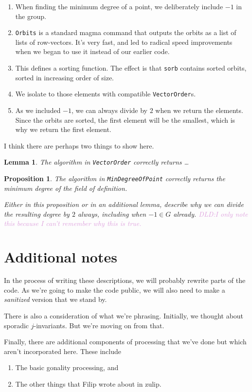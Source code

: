 \documentclass[11pt,reqno]{amsart}
\makeatletter
\theoremstyle{plain}
\newtheorem{lemma}[theorem]{Lemma}
\newtheorem{proposition}[theorem]{Proposition}
\theoremstyle{definition}
\newcommand{\DLD}[1]{\textcolor{Plum}{DLD:\@ #1}}
\makeatother
\begin{document}
\begin{enumerate}
  \item When finding the minimum degree of a point, we deliberately include
  $-1$ in the group.

  \item \texttt{Orbits} is a standard magma command that outputs the orbits as
  a list of lists of row-vectors. It's very fast, and led to radical speed
  improvements when we began to use it instead of our earlier code.

  \item This defines a sorting function. The effect is that \texttt{sorb}
  contains sorted orbits, sorted in increasing order of size.

  \item We isolate to those elements with compatible \texttt{VectorOrder}s.

  \item As we included $-1$, we can always divide by $2$ when we return the
  elements. Since the orbits are sorted, the first element will be the
  smallest, which is why we return the first element.
\end{enumerate}

I think there are perhaps two things to show here.

\begin{lemma}
  The algorithm in \texttt{VectorOrder} correctly returns \ldots
\end{lemma}

\begin{proposition}
  The algorithm in \texttt{MinDegreeOfPoint} correctly returns the minimum
  degree of the field of definition.

  Either in this proposition or in an additional lemma, describe why we can
  divide the resulting degree by $2$ \emph{always}, including when $-1 \in G$
  already. \DLD{I only note this because I can't remember why this is true.}
\end{proposition}


\section{Additional notes}

In the process of writing these descriptions, we will probably rewrite parts of
the code. As we're going to make the code public, we will also need to make a
\emph{sanitized} version that we stand by.

There is also a consideration of what we're phrasing. Initially, we thought
about sporadic $j$-invariants. But we're moving on from that.

Finally, there are additional components of processing that we've done but
which aren't incorporated here. These include

\begin{enumerate}
  \item The basic gonality processing, and
  \item The other things that Filip wrote about in zulip.
\end{enumerate}


\vspace{20 mm}


\end{document}
